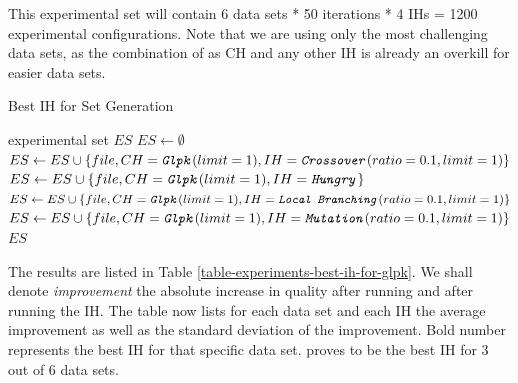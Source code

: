 This experimental set will contain 6 data sets * 50 iterations * 4 IHs = 1200 experimental configurations. Note that we are using only the most challenging data sets, as the combination of  as CH and any other IH is already an overkill for easier data sets.\\

\begin{algorithm}
\caption{Best IH for  Set Generation}
\label{listing-experiment-best-ih-for-glpk}
\begin{algorithmic}
\ENSURE experimental set $ES$
\STATE $ES \gets \emptyset$
    	\STATE $ES \gets ES \cup \{file, CH = \texttt{\textit{Glpk}}(limit = 1), IH = \texttt{\textit{Crossover}}(ratio = 0.1, limit = 1)\}$
    	\STATE $ES \gets ES \cup \{file, CH = \texttt{\textit{Glpk}}(limit = 1), IH = \texttt{\textit{Hungry}}\}$
    	\STATE $ES \gets ES \cup \{file, CH = \texttt{\textit{Glpk}}(limit = 1), IH = \texttt{\textit{Local Branching}}(ratio = 0.1, limit = 1)\}$
    	\STATE $ES \gets ES \cup \{file, CH = \texttt{\textit{Glpk}}(limit = 1), IH = \texttt{\textit{Mutation}}(ratio = 0.1, limit = 1)\}$
  \ENDFOR
\ENDFOR
\RETURN $ES$
\end{algorithmic}
\end{algorithm}

The results are listed in Table \ref{table-experiments-best-ih-for-glpk}. We shall denote \textit{improvement} the absolute increase in quality after running  and after running the IH. The table now lists for each data set and each IH the average improvement as well as the standard deviation of the improvement. Bold number represents the best IH for that specific data set.  proves to be the best IH for 3 out of 6 data sets.


